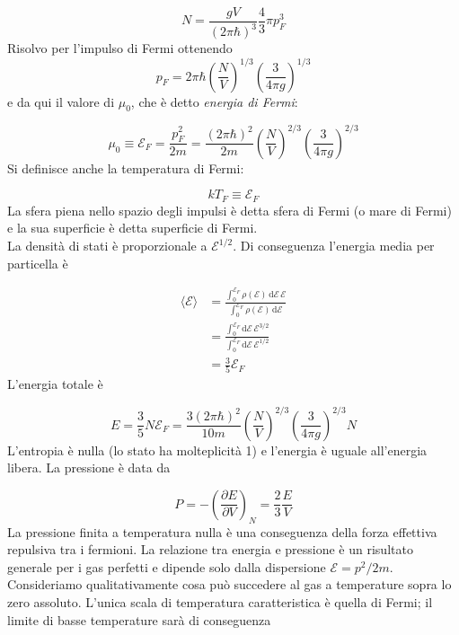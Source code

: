 \documentclass[a4paper]{report}
\newcommand\ddfrac[2]{\frac{\displaystyle #1}{\displaystyle #2}}
\begin{document}
\begin{equation}
    N = \frac{g V}{(2\pi\hbar)^3}\frac{4}{3}\pi p_F^3
\end{equation}
Risolvo per l'impulso di Fermi ottenendo 
\begin{equation}
    p_F = 2\pi\hbar \left(\frac{N}{V}\right)^{1/3}\left(\frac{3}{4\pi g}\right)^{1/3}
\end{equation}
e da qui il valore di $\mu_0$, che è detto \textit{energia di Fermi}:

\begin{equation}
    \mu_0 \equiv \mathcal{E}_F = \frac{p_F^2}{2m} = \frac{(2\pi\hbar)^2}{2m} \left(\frac{N}{V}\right)^{2/3}\left(\frac{3}{4\pi g}\right)^{2/3}
\end{equation}
Si definisce anche la temperatura di Fermi:

\begin{equation}
    k T_F \equiv \mathcal{E}_F
\end{equation}
La sfera piena nello spazio degli impulsi è detta sfera di Fermi (o mare di Fermi) e la sua superficie è detta superficie di Fermi. \\
La densità di stati è proporzionale a $\mathcal{E}^{1/2}$. Di conseguenza l'energia media per particella è

\begin{equation}
    \begin{split}
        \langle\mathcal{E}\rangle & = \ddfrac{\int_0^{\mathcal{E}_F} \rho(\mathcal{E})\,\mathrm{d}\mathcal{E} \,\mathcal{E}}{\int_0^{\mathcal{E}_F} \rho(\mathcal{E})\,\mathrm{d}\mathcal{E}} \\
        & = \ddfrac{\int_0^{\mathcal{E}_F} \mathrm{d}\mathcal{E} \,\mathcal{E}^{3/2}}{\int_0^{\mathcal{E}_F} \mathrm{d}\mathcal{E}\,\mathcal{E}^{1/2}}  \\
        & = \frac{3}{5}\mathcal{E}_F
    \end{split}
\end{equation}
L'energia totale è

\begin{equation}
    E = \frac{3}{5}N\mathcal{E}_F = \frac{3(2\pi\hbar)^2}{10m} \left(\frac{N}{V}\right)^{2/3}\left(\frac{3}{4\pi g}\right)^{2/3} N
\end{equation}
L'entropia è nulla (lo stato ha molteplicità 1) e l'energia è uguale all'energia libera. La pressione è data da

\begin{equation}
    P = -\left(\frac{\partial E}{\partial V}\right)_N = \frac{2}{3} \frac{E}{V}
    \label{energia-pressione}
\end{equation}
La pressione finita a temperatura nulla è una conseguenza della forza effettiva repulsiva tra i fermioni. La relazione tra energia e pressione è un risultato generale per i gas perfetti e dipende solo dalla dispersione $\mathcal{E}=p^2/2m$.\\
Consideriamo qualitativamente cosa può succedere al gas a temperature sopra lo zero assoluto. L'unica scala di temperatura caratteristica è quella di Fermi; il limite di basse temperature sarà di conseguenza
\end{document}
